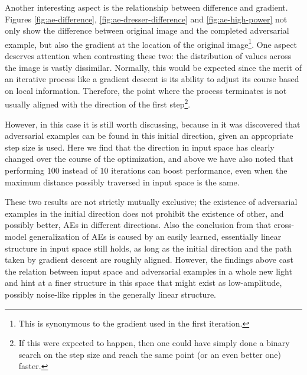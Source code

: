 \documentclass[11pt, a4paper]{article}
\begin{document}
Another interesting aspect is the relationship between difference and gradient. Figures \ref{fig:ae-difference}, \ref{fig:ae-dresser-difference} and \ref{fig:ae-high-power} not only show the difference between original image and the completed adversarial example, but also the gradient at the location of the original image\footnote{This is synonymous to the gradient used in the first iteration.}. One aspect deserves attention when contrasting these two: the distribution of values across the image is vastly dissimilar. Normally, this would be expected since the merit of an iterative process like a gradient descent is its ability to adjust its course based on local information. Therefore, the point where the process terminates is not usually aligned with the direction of the first step\footnote{If this were expected to happen, then one could have simply done a binary search on the step size and reach the same point (or an even better one) faster.}.

However, in this case it is still worth discussing, because in \cite{explaining-and-harnessing-adversarial-examples} it was discovered that adversarial examples can be found in this initial direction, given an appropriate step size is used. Here we find that the direction in input space has clearly changed over the course of the optimization, and above we have also noted that performing $100$ instead of $10$ iterations can boost performance, even when the maximum distance possibly traversed in input space is the same.

These two results are not strictly mutually exclusive; the existence of adversarial examples in the initial direction does not prohibit the existence of other, and possibly better, AEs in different directions. Also the conclusion from \cite{explaining-and-harnessing-adversarial-examples} that cross-model generalization of AEs is caused by an easily learned, essentially linear structure in input space still holds, as long as the initial direction and the path taken by gradient descent are roughly aligned. However, the findings above cast the relation between input space and adversarial examples in a whole new light and hint at a finer structure in this space that might exist as low-amplitude, possibly noise-like ripples in the generally linear structure.
\end{document}
